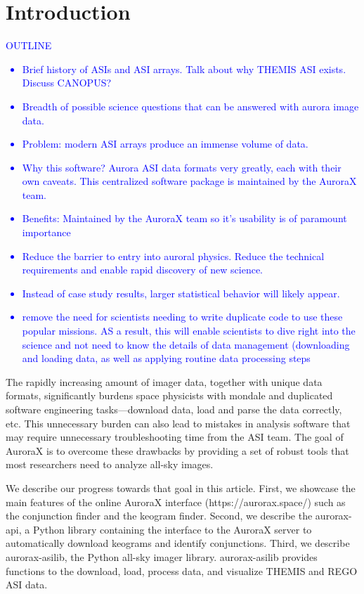 \documentclass[draft]{agujournal2019}
\begin{document}
\section{Introduction}\label{intro}
\textcolor{blue}{
      OUTLINE
      \begin{itemize}
            \item Brief history of ASIs and ASI arrays. Talk about why THEMIS ASI exists. Discuss CANOPUS?
            \item Breadth of possible science questions that can be answered with aurora image data.
            \item Problem: modern ASI arrays produce an immense volume of data.
            \item Why this software? Aurora ASI data formats very greatly, each with their own caveats. This centralized software package is maintained by the AuroraX team. 
            \item Benefits: Maintained by the AuroraX team so it's usability is of paramount importance
            \item Reduce the barrier to entry into auroral physics. Reduce the technical requirements and  enable rapid discovery of new science.
            \item Instead of case study results, larger statistical behavior will likely appear.
            \item remove the need for scientists needing to write duplicate code to use these popular missions. AS a result, this will enable scientists to dive right into the science and not need to know the details of data management (downloading and loading data, as well as applying routine data processing steps
      \end{itemize}
}

The rapidly increasing amount of imager data, together with unique data formats, significantly burdens space physicists with mondale and duplicated software engineering tasks---download data, load and parse the data correctly, etc. This unnecessary burden can also lead to mistakes in analysis software that may require unnecessary troubleshooting time from the ASI team. The goal of AuroraX is to overcome these drawbacks by providing a set of robust tools that most researchers need to analyze all-sky images. 

We describe our progress towards that goal in this article. First, we showcase the main features of the online AuroraX interface (https://aurorax.space/) such as the conjunction finder and the keogram finder. Second, we describe the aurorax-api, a Python library containing the interface to the AuroraX server to automatically download keograms and identify conjunctions. Third, we describe aurorax-asilib, the Python all-sky imager library. aurorax-asilib provides functions to the download, load, process data, and visualize THEMIS and REGO ASI data. 
\end{document}
